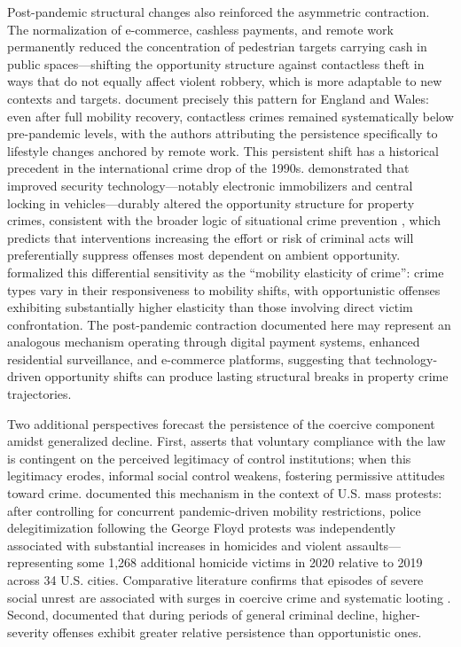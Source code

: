\documentclass[pdflatex,sn-basic]{sn-jnl}
\begin{document}
Post-pandemic structural changes also reinforced the asymmetric contraction. The normalization of e-commerce, cashless payments, and remote work permanently reduced the concentration of pedestrian targets carrying cash in public spaces---shifting the opportunity structure against contactless theft in ways that do not equally affect violent robbery, which is more adaptable to new contexts and targets. \citet{seyidoglu2024} document precisely this pattern for England and Wales: even after full mobility recovery, contactless crimes remained systematically below pre-pandemic levels, with the authors attributing the persistence specifically to lifestyle changes anchored by remote work. This persistent shift has a historical precedent in the international crime drop of the 1990s. \citet{farrell2011} demonstrated that improved security technology---notably electronic immobilizers and central locking in vehicles---durably altered the opportunity structure for property crimes, consistent with the broader logic of situational crime prevention \citep{clarke1995}, which predicts that interventions increasing the effort or risk of criminal acts will preferentially suppress offenses most dependent on ambient opportunity. \citet{halford2020} formalized this differential sensitivity as the ``mobility elasticity of crime'': crime types vary in their responsiveness to mobility shifts, with opportunistic offenses exhibiting substantially higher elasticity than those involving direct victim confrontation. The post-pandemic contraction documented here may represent an analogous mechanism operating through digital payment systems, enhanced residential surveillance, and e-commerce platforms, suggesting that technology-driven opportunity shifts can produce lasting structural breaks in property crime trajectories.

Two additional perspectives forecast the persistence of the coercive component amidst generalized decline. First, \citet{tyler2006} asserts that voluntary compliance with the law is contingent on the perceived legitimacy of control institutions; when this legitimacy erodes, informal social control weakens, fostering permissive attitudes toward crime. \citet{rosenfeld2021} documented this mechanism in the context of U.S. mass protests: after controlling for concurrent pandemic-driven mobility restrictions, police delegitimization following the George Floyd protests was independently associated with substantial increases in homicides and violent assaults---representing some 1,268 additional homicide victims in 2020 relative to 2019 across 34 U.S. cities. Comparative literature confirms that episodes of severe social unrest are associated with surges in coercive crime and systematic looting \citep{bell2014,mongale2022}. Second, \citet{blumstein1988} documented that during periods of general criminal decline, higher-severity offenses exhibit greater relative persistence than opportunistic ones.
\end{document}

